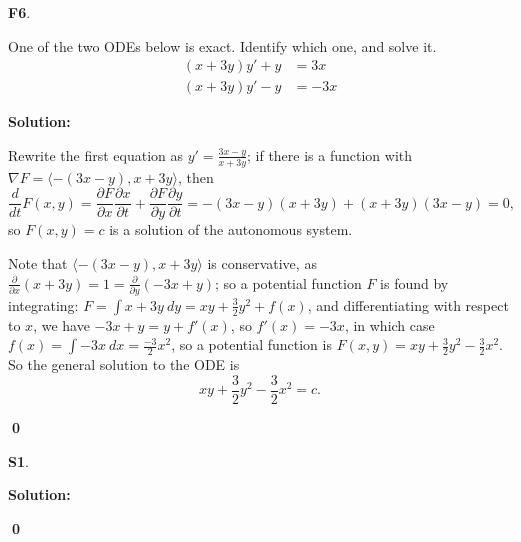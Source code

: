 \documentclass{article}
\newenvironment{problem}[1]
{
  \begin{flushleft}
  \textbf{#1}.
  \ignorespaces
}
{
  \end{flushleft}
}
\newenvironment{solution}
{
  \ignorespaces
  \textbf{Solution:}
}
{
  \ignorespacesafterend
  \begin{flushright}
  {\bfseries \qed}
  \end{flushright}
}
\begin{document}
\begin{problem}{F6}
One of the two ODEs below is exact.  Identify which one, and solve it.
\begin{align*}
 (x + 3y)y'+y &=3x \\ %
 (x + 3y)y'-y &=-3x  
\end{align*}
\end{problem}
\begin{solution}
Rewrite the first equation as \(y'=\frac{3x-y}{x+3y}\); if there is a function with \(\nabla F = \langle -(3x-y), x+3y\rangle\), then \[\frac{d}{dt}F(x,y)=\frac{\partial F}{\partial x} \frac{\partial x}{\partial t} + \frac{\partial F}{\partial y} \frac{\partial y}{\partial t} = -(3x-y)(x+3y)+(x+3y)(3x-y)=0,\] so \(F(x,y)=c\) is a solution of the autonomous system.

Note that  \(\langle -(3x-y), x+3y\rangle\) is conservative, as \(\frac{\partial}{\partial x}(x+3y)=1=\frac{\partial}{\partial y}(-3x+y)\); so a potential function \(F\) is found by integrating: \(F = \int x+3y\ dy = xy+\frac{3}{2}y^2+f(x) \), and differentiating with respect to \(x\), we have \(-3x+y=y+f'(x)\), so \(f'(x)=-3x\), in which case \(f(x)=\int -3x\ dx = \frac{-3}{2}x^2\), so a potential function is \(F(x,y)=xy+\frac{3}{2}y^2-\frac{3}{2}x^2\).  So the general solution to the ODE is
\[ xy+\frac{3}{2}y^2-\frac{3}{2}x^2 = c.\]
\end{solution}

\begin{problem}{S1}

\end{problem}
\begin{solution}

\end{solution}
\end{document}
